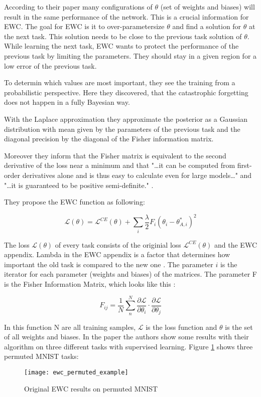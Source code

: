 According to their paper many configurations of $\theta$ (set of weights and biases) will result in the same performance of the network.
This is a crucial information for EWC.
The goal for EWC is it to over-parametersize $\theta$ and find a solution for $\theta$ at the next task.
This solution needs to be close to the previous task solution of $\theta$.
While learning the next task, EWC wants to protect the performance of the previous task by limiting the parameters.
They should stay in a given region for a low error of the previous task.
\cite{elastic-weight-consolidation}

To determin which values are most important, they see the training from a probabilistic perspective.
Here they discovered, that the catastrophic forgetting does not happen in a fully Bayesian way.
\cite{elastic-weight-consolidation}

With the Laplace approximation they approximate the posterior as a Gaussian distribution with mean given by the parameters of the previous task and the diagonal precision by the diagonal of the Fisher information matrix.
\cite{elastic-weight-consolidation}

Moreover they inform that the Fisher matrix is equivalent to the second derivative of the loss near a minimum and that "…it can be computed from first-order derivatives alone and is thus easy to calculate even for large models…" \cite{elastic-weight-consolidation} and "…it is guaranteed to be positive semi-definite."
\cite{elastic-weight-consolidation}.
\cite{elastic-weight-consolidation}

They propose the EWC function as following:

$$\mathcal{L}(\theta) = \mathcal{L}^{CE}(\theta) + \sum_{i} \frac{\lambda}{2} F_{i} (\theta_{i} - 
\theta_{A,i}^{*})^2 $$

The loss $\mathcal{L}(\theta)$ of every task consists of the originial loss $\mathcal{L}^{CE}(\theta)$ and the EWC appendix.
Lambda in the EWC appendix is a factor that determines how important the old task is compared to the new one \cite{elastic-weight-consolidation}.
The parameter $i$ is the iterator for each parameter (weights and biases) of the matrices.
The parameter F is the Fisher Information Matrix, which looks like this \cite{incremental-moment-matching}:

$$F_{ij} = \frac{1}{N} \sum_{n}^{N} \frac{\partial \mathcal{L}}{\partial \theta_{i}} \cdot \frac{\partial \mathcal{L}}{\partial \theta_{j}}$$

In this function N are all training samples, $\mathcal{L}$ is the loss function and $\theta$ is the set of all weights and biases.
In the paper the authors show some results with their algorithm on three different tasks with supervised learning. Figure \ref{fig:ewc_permuted_example} shows three permuted MNIST tasks:
\begin{figure}[H]
    \centering
    \texttt{[image: ewc\_permuted\_example]}
    \caption{\cite{elastic-weight-consolidation} Original EWC results on permuted MNIST}
    \label{fig:ewc_permuted_example}
\end{figure}